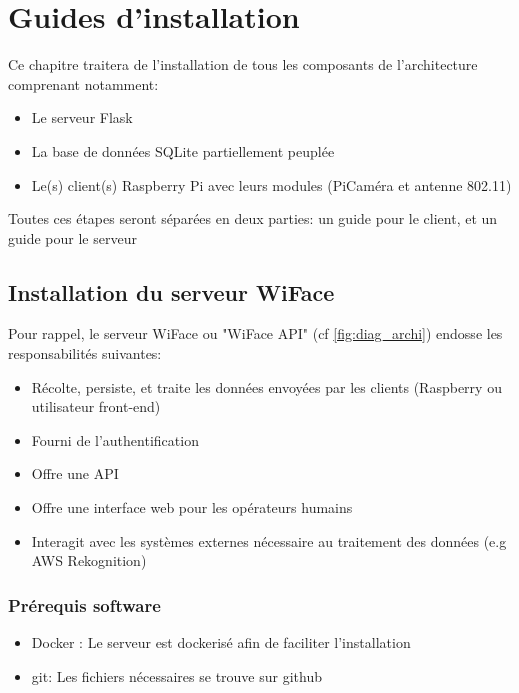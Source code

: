 \chapter{Guides d'installation}
\label{ch:guide_installation}

Ce chapitre traitera de l'installation de tous les composants de l'architecture comprenant notamment: 
\begin{itemize}
    \item Le serveur Flask
    \item La base de données SQLite partiellement peuplée
    \item Le(s) client(s) Raspberry Pi avec leurs modules (PiCaméra et antenne 802.11)
\end{itemize}
Toutes ces étapes seront séparées en deux parties: un guide pour le client, et un guide pour le serveur 
\section{Installation du serveur WiFace}
Pour rappel, le serveur WiFace ou "WiFace API" (cf \ref{fig:diag_archi}) endosse les responsabilités
suivantes: 
\begin{itemize}
    \item Récolte, persiste, et traite les données envoyées par les clients (Raspberry ou utilisateur front-end)
    \item Fourni de l'authentification
    \item Offre une API
    \item Offre une interface web pour les opérateurs humains
    \item Interagit avec les systèmes externes nécessaire au traitement des données (e.g AWS Rekognition)
\end{itemize}

\subsection{Prérequis software}
\begin{itemize}
    \item Docker : Le serveur est dockerisé afin de faciliter l'installation
    \item git: Les fichiers nécessaires se trouve sur github
\end{itemize}

